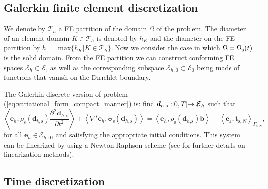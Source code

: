 \documentclass[11pt,english]{article}
\begin{document}
\subsection{Galerkin finite element discretization}

We denote by $\mathcal{T}_h$ a FE partition of the domain $\Omega$ of the problem. The diameter of an element domain $K \in \mathcal{T}_h $ is denoted by $h_K$ and the diameter on the FE partition by $h=\text{ max} \lbrace h_K | K \in \mathcal{T}_h  \rbrace$.  Now we consider the case in which $\Omega = \Omega_{\rm s}(t)$ is the solid domain. From the FE partition we can construct conforming FE spaces $\boldsymbol{\mathcal{E}}_h \subset \boldsymbol{\mathcal{E}}$, as well as the corresponding subspace $\boldsymbol{\mathcal{E}}_{h,0} \subset \boldsymbol{\mathcal{E}}_0$ being made of functions that vanish on the Dirichlet boundary.

The Galerkin discrete version of problem (\ref{eq:variational_form_compact_manner}) is: find $\boldsymbol{d}_{h,\rm{s}} : ]0,T[ \rightarrow  \boldsymbol{\mathcal{E}}_h $ such that
\begin{equation*}
    \left \langle \boldsymbol{e}_{h} ,\rho_\mathrm{s}\left(\boldsymbol{d}_{h,\mathrm{s}}\right) \frac{\partial^2 \boldsymbol{d}_{h,\mathrm{s}}}{\partial t^2} \right \rangle + \left \langle \nabla^{\mathrm{s}} \boldsymbol{e}_{h} , \boldsymbol{\sigma}_\mathrm{s} \left ( \boldsymbol{d}_{h,\mathrm{s}} \right) \right \rangle = \left \langle \boldsymbol{e}_{h} , \rho_\mathrm{s}\left(\boldsymbol{d}_{h,\mathrm{s}}\right) \boldsymbol{b} \right \rangle + \left \langle \boldsymbol{e}_{h} , \boldsymbol{t}_{\mathrm{s},N} \right \rangle_{\Gamma_{\mathrm{s},N}},
    \label{eq:variational_form_compact_manner_spatial_discretized}
\end{equation*}
for all $\boldsymbol{e}_{h} \in \boldsymbol{\mathcal{E}}_{h,0}$, and satisfying the appropriate initial conditions. This system can be linearized by using a Newton-Raphson scheme (see \cite{Bonet} for further details on linearization methods).

\subsection{Time discretization}
\end{document}
